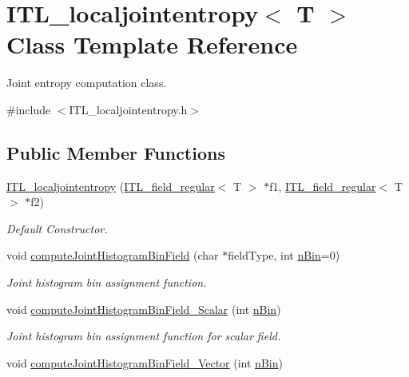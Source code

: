 \hypertarget{classITL__localjointentropy}{
\section{ITL\_\-localjointentropy$<$ T $>$ Class Template Reference}
\label{classITL__localjointentropy}
}


Joint entropy computation class.  




{\ttfamily \#include $<$ITL\_\-localjointentropy.h$>$}

\subsection*{Public Member Functions}
\begin{DoxyCompactItemize}
\item 
\hyperlink{classITL__localjointentropy_a5e579f10a227887be6f31d7b3c8f6264}{ITL\_\-localjointentropy} (\hyperlink{classITL__field__regular}{ITL\_\-field\_\-regular}$<$ T $>$ $\ast$f1, \hyperlink{classITL__field__regular}{ITL\_\-field\_\-regular}$<$ T $>$ $\ast$f2)
\begin{DoxyCompactList}\small\item\em Default Constructor. \item\end{DoxyCompactList}\item 
void \hyperlink{classITL__localjointentropy_ae9be80bf2f4a78369bcbddcddc59d6d7}{computeJointHistogramBinField} (char $\ast$fieldType, int \hyperlink{MainIT__regvector_8cpp_a7f13753d4707f6bc8f71d8bdacedefb3}{nBin}=0)
\begin{DoxyCompactList}\small\item\em Joint histogram bin assignment function. \item\end{DoxyCompactList}\item 
void \hyperlink{classITL__localjointentropy_a1b96f07f6412ed4de52831b52b1c76b3}{computeJointHistogramBinField\_\-Scalar} (int \hyperlink{MainIT__regvector_8cpp_a7f13753d4707f6bc8f71d8bdacedefb3}{nBin})
\begin{DoxyCompactList}\small\item\em Joint histogram bin assignment function for scalar field. \item\end{DoxyCompactList}\item 
void \hyperlink{classITL__localjointentropy_aea0240252de7ae30bf4835451421f689}{computeJointHistogramBinField\_\-Vector} (int \hyperlink{MainIT__regvector_8cpp_a7f13753d4707f6bc8f71d8bdacedefb3}{nBin})

\end{DoxyCompactItemize}
